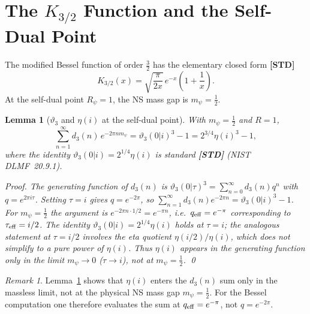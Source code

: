 \documentclass[12pt,a4paper]{article}
\newtheorem{lemma}[theorem]{Lemma}
\theoremstyle{definition}
\theoremstyle{remark}
\newtheorem{remark}[theorem]{Remark}
\newcommand{\STD}{\textbf{[STD]}}
\begin{document}
\section{The $K_{3/2}$ Function and the Self-Dual Point}
\label{sec:k32}

The modified Bessel function of order $\tfrac32$ has the elementary closed form
\STD{}
\begin{equation}
  K_{3/2}(x) = \sqrt{\frac{\pi}{2x}}\,e^{-x}\left(1 + \frac{1}{x}\right).
  \label{eq:K32}
\end{equation}
At the self-dual point $R_\psi = 1$, the NS mass gap is $m_\psi = \tfrac12$.

\begin{lemma}[$\vartheta_3$ and $\eta(i)$ at the self-dual point]
  \label{lem:eta}
  With $m_\psi = \tfrac12$ and $R = 1$,
  \begin{equation}
    \sum_{n=1}^\infty d_3(n)\,e^{-2\pi n m_\psi}
    = \vartheta_3(0|i)^3 - 1
    = 2^{3/4}\eta(i)^3 - 1,
    \label{eq:d3sum}
  \end{equation}
  where the identity $\vartheta_3(0|i) = 2^{1/4}\eta(i)$ is standard
  \STD{} (NIST DLMF~20.9.1).
  \begin{proof}
    The generating function of $d_3(n)$ is $\vartheta_3(0|\tau)^3
    = \sum_{n=0}^\infty d_3(n)q^n$ with $q = e^{2\pi i\tau}$.
    Setting $\tau = i$ gives $q = e^{-2\pi}$, so
    $\sum_{n=1}^\infty d_3(n)e^{-2\pi n} = \vartheta_3(0|i)^3 - 1$.
    For $m_\psi = \tfrac12$ the argument is $e^{-2\pi n \cdot 1/2} = e^{-\pi n}$,
    i.e.\ $q_{\rm eff} = e^{-\pi}$ corresponding to $\tau_{\rm eff} = i/2$.
    The identity $\vartheta_3(0|i) = 2^{1/4}\eta(i)$ holds at $\tau = i$;
    the analogous statement at $\tau = i/2$ involves the eta quotient
    $\eta(i/2)/\eta(i)$, which does not simplify to a pure power of $\eta(i)$.
    Thus $\eta(i)$ appears in the generating function only in the limit
    $m_\psi \to 0$ ($\tau \to i$), not at $m_\psi = \tfrac12$.
    \qed
  \end{proof}
\end{lemma}

\begin{remark}
  Lemma~\ref{lem:eta} shows that $\eta(i)$ enters the $d_3(n)$ sum only in
  the massless limit, not at the physical NS mass gap $m_\psi = \tfrac12$.
  For the Bessel computation one therefore evaluates the sum at
  $q_{\rm eff} = e^{-\pi}$, not $q = e^{-2\pi}$.
\end{remark}
\end{document}
